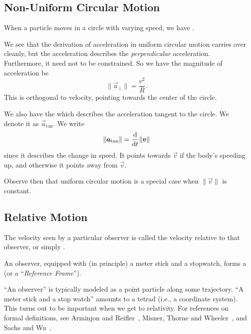 \subsection{Non-Uniform Circular Motion}
\begin{definition}
When a particle moves in a circle with varying speed, we have
.
\end{definition}
\M
We see that the derivation of acceleration in uniform circular motion
carries over cleanly, but the acceleration describes the
\emph{perpendicular} acceleration. Furthermore, it need not to be
constrained. So we have the magnitude of acceleration be
\begin{equation}
  \|\vec{a}_{\perp}\| = \frac{v^{2}}{R}.
\end{equation}
This is orthogonal to velocity, pointing towards the center of the
circle.

\begin{definition}
We also have the  which describes the
acceleration tangent to the circle. We denote it as
$\vec{a}_{\text{tan}}$. We write
\begin{equation}
\|\vec{a}_{\text{tan}}\| = \frac{\D}{\D t}\|\vec{v}\|
\end{equation}
since it describes the change in speed. It points towards $\vec{v}$ if
the body's speeding up, and otherwise it points away from $\vec{v}$.
\end{definition}
\begin{remark}
Observe then that uniform circular motion is a special case when
$\|\vec{v}\|$ is constant.
\end{remark}

\subsection{Relative Motion}
\begin{definition}
The velocity seen by a particular observer is called the velocity
relative to that observer, or simply .
\end{definition}

\begin{definition}
An observer, equipped with (in principle) a meter stick and a stopwatch,
forms a  (or a ``\textit{Reference Frame\/}'').
\end{definition}
\begin{remark}
``An observer'' is typically modeled as a point particle along some
trajectory. ``A meter stick and a stop watch'' amounts to a tetrad
(i.e., a coordinate system). This turns out to be important when we get
to relativity. For references on formal definitions, see Arminjon and
Reifler~\cite{Arminjon:2010ah}, Misner, Thorne and Wheeler~\cite[ch 6
and \S13.6]{Misner:1974qy}, and Sachs and Wu~\cite[ch 2]{sachs1977gr}.
\end{remark}
